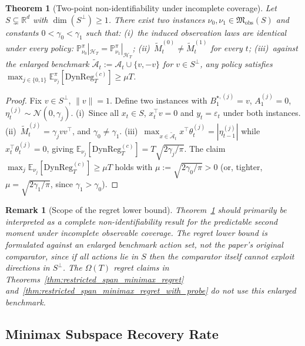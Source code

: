 \documentclass[11pt]{article}
\newcommand{\R}{\mathbb{R}}
\newcommand{\E}{\mathbb{E}}
\newcommand{\Prob}{\mathbb{P}}
\newcommand{\cA}{\mathcal{A}}
\newcommand{\cH}{\mathcal{H}}
\newcommand{\DynReg}{\mathrm{DynReg}}
\newtheorem{theorem}{Theorem}
\newtheorem{remark}{Remark}
\begin{document}
\begin{theorem}[Two-point non-identifiability under incomplete coverage]
\label{thm:two_point_testing}
Let $S\subsetneq\R^d$ with $\dim(S^\perp)\ge 1$.
There exist two instances $\nu_0,\nu_1\in\mathfrak{M}_{\mathrm{obs}}(S)$ and
constants $0<\gamma_0<\gamma_1$ such that:
(i)~the induced observation laws are identical under every policy:
$\Prob_{\nu_0}^\pi|_{\cH_T}=\Prob_{\nu_1}^\pi|_{\cH_T}$;
(ii)~$\widetilde{M}_t^{(0)}\neq\widetilde{M}_t^{(1)}$ for every $t$;
(iii)~against the enlarged benchmark $\widetilde{\cA}_t:=\cA_t\cup\{v,-v\}$
for $v\in S^\perp$, any policy satisfies
$\max_{j\in\{0,1\}}\E_{\nu_j}^\pi[\DynReg_T^{(c)}]\ge\mu T$.
\end{theorem}

\begin{proof}
Fix $v\in S^\perp$, $\|v\|=1$.
Define two instances with $B_1^{\star,(j)}=v$, $A_1^{(j)}=0$,
$\eta_t^{(j)}\sim\mathcal{N}(0,\gamma_j)$.
(i)~Since all $x_t\in S$, $x_t^\top v=0$ and $y_t=\varepsilon_t$ under both instances.
(ii)~$\widetilde{M}_t^{(j)}=\gamma_j vv^\top$, and $\gamma_0\neq\gamma_1$.
(iii)~$\max_{x\in\widetilde{\cA}_t}x^\top\theta_t^{(j)}=|\eta_{t-1}^{(j)}|$
while $x_t^\top\theta_t^{(j)}=0$, giving
$\E_{\nu_j}[\DynReg_T^{(c)}]=T\sqrt{2\gamma_j/\pi}$.  The claim
$\max_j \E_{\nu_j}[\DynReg_T^{(c)}]\ge\mu T$ holds with
$\mu:=\sqrt{2\gamma_0/\pi}>0$ (or, tighter, $\mu=\sqrt{2\gamma_1/\pi}$, since
$\gamma_1>\gamma_0$).
\end{proof}

\begin{remark}[Scope of the regret lower bound]
\label{rem:scope_augmented_regret_lb}
Theorem~\ref{thm:two_point_testing} should primarily be interpreted as a complete
non-identifiability result for the predictable second moment under incomplete observable
coverage.  The regret lower bound is formulated against an enlarged benchmark action set,
not the paper's original comparator, since if all actions lie in $S$ then the comparator
itself cannot exploit directions in $S^\perp$.  The $\Omega(T)$ regret claims in
Theorems~\ref{thm:restricted_span_minimax_regret}
and~\ref{thm:restricted_span_minimax_regret_with_probe} do not use this enlarged benchmark.
\end{remark}

\subsection{Minimax Subspace Recovery Rate}
\label{sec:minimax_recovery}
\end{document}
